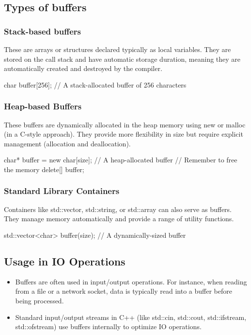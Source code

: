 \documentclass{report}
\begin{document}
\begin{concept}
    \subsection{Types of buffers}
    \bigbreak \noindent 
    \subsubsection{Stack-based buffers}
    \bigbreak \noindent 
    These are arrays or structures declared typically as local variables. They are stored on the call stack and have automatic storage duration, meaning they are automatically created and destroyed by the compiler.
    \bigbreak \noindent 
    \begin{cppcode}
    char buffer[256]; // A stack-allocated buffer of 256 characters
    \end{cppcode}
    \bigbreak \noindent 
    \subsubsection{Heap-based Buffers}
    \bigbreak \noindent 
    These buffers are dynamically allocated in the heap memory using new or malloc (in a C-style approach). They provide more flexibility in size but require explicit management (allocation and deallocation).
    \bigbreak \noindent 
    \begin{cppcode}
    char* buffer = new char[size]; // A heap-allocated buffer
    // Remember to free the memory
    delete[] buffer;
    \end{cppcode}
    \bigbreak \noindent 
    \subsubsection{Standard Library Containers}
    \bigbreak \noindent 
    Containers like std::vector, std::string, or std::array can also serve as buffers. They manage memory automatically and provide a range of utility functions.
    \bigbreak \noindent 
    \begin{cppcode}
    std::vector<char> buffer(size); // A dynamically-sized buffer
    \end{cppcode}

    \pagebreak 
    \subsection{Usage in IO Operations}
    \bigbreak \noindent 
    \begin{itemize}
        \item Buffers are often used in input/output operations. For instance, when reading from a file or a network socket, data is typically read into a buffer before being processed.
        \item Standard input/output streams in C++ (like std::cin, std::cout, std::ifstream, std::ofstream) use buffers internally to optimize IO operations.
    \end{itemize}


\end{concept}
\end{document}
